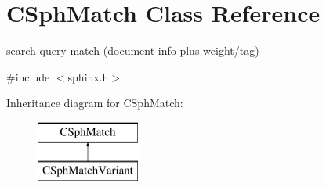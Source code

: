 \hypertarget{classCSphMatch}{\section{C\-Sph\-Match Class Reference}
\label{classCSphMatch}
}


search query match (document info plus weight/tag)  




{\ttfamily \#include $<$sphinx.\-h$>$}

Inheritance diagram for C\-Sph\-Match\-:\begin{figure}[H]
\begin{center}
\leavevmode
\includegraphics[height=2.000000cm]{classCSphMatch}
\end{center}
\end{figure}
